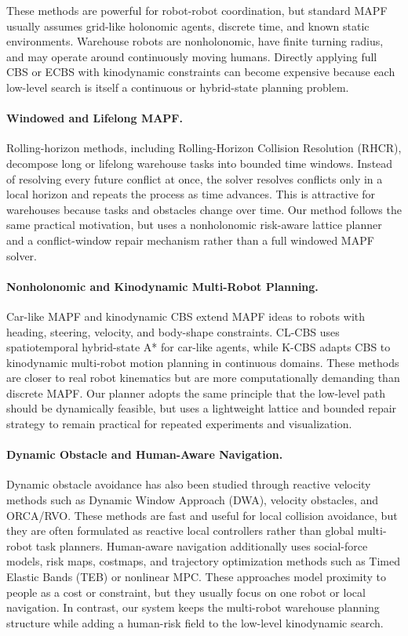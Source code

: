 \documentclass[10pt,twocolumn,letterpaper]{article}
\begin{document}
These methods are powerful for robot-robot coordination, but standard MAPF usually assumes grid-like holonomic agents, discrete time, and known static environments. Warehouse robots are nonholonomic, have finite turning radius, and may operate around continuously moving humans. Directly applying full CBS or ECBS with kinodynamic constraints can become expensive because each low-level search is itself a continuous or hybrid-state planning problem.

\paragraph{Windowed and Lifelong MAPF.}
Rolling-horizon methods, including Rolling-Horizon Collision Resolution (RHCR), decompose long or lifelong warehouse tasks into bounded time windows. Instead of resolving every future conflict at once, the solver resolves conflicts only in a local horizon and repeats the process as time advances. This is attractive for warehouses because tasks and obstacles change over time. Our method follows the same practical motivation, but uses a nonholonomic risk-aware lattice planner and a conflict-window repair mechanism rather than a full windowed MAPF solver.

\paragraph{Nonholonomic and Kinodynamic Multi-Robot Planning.}
Car-like MAPF and kinodynamic CBS extend MAPF ideas to robots with heading, steering, velocity, and body-shape constraints. CL-CBS uses spatiotemporal hybrid-state A* for car-like agents, while K-CBS adapts CBS to kinodynamic multi-robot motion planning in continuous domains. These methods are closer to real robot kinematics but are more computationally demanding than discrete MAPF. Our planner adopts the same principle that the low-level path should be dynamically feasible, but uses a lightweight lattice and bounded repair strategy to remain practical for repeated experiments and visualization.

\paragraph{Dynamic Obstacle and Human-Aware Navigation.}
Dynamic obstacle avoidance has also been studied through reactive velocity methods such as Dynamic Window Approach (DWA), velocity obstacles, and ORCA/RVO. These methods are fast and useful for local collision avoidance, but they are often formulated as reactive local controllers rather than global multi-robot task planners. Human-aware navigation additionally uses social-force models, risk maps, costmaps, and trajectory optimization methods such as Timed Elastic Bands (TEB) or nonlinear MPC. These approaches model proximity to people as a cost or constraint, but they usually focus on one robot or local navigation. In contrast, our system keeps the multi-robot warehouse planning structure while adding a human-risk field to the low-level kinodynamic search.
\end{document}
